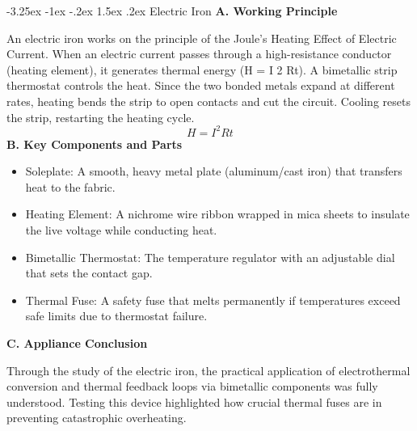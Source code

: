 \documentclass[11pt,a4paper]{report}
\makeatletter
\renewcommand{\section}{\@startsection{section}{1}{\z@}%
  {-3.25ex \@plus -1ex \@minus -.2ex}%
  {1.5ex \@plus.2ex}%
  {\normalfont\Large\bfseries\color{primaryColor}}}
\makeatother
\begin{document}
\section{Electric Iron}
\noindent\textbf{A. Working Principle}\par\medskip
An electric iron works on the principle of the Joule's Heating Effect of Electric Current. When an electric current passes through a high-resistance conductor (heating element), it generates thermal energy (H = I 2 Rt). A bimetallic strip thermostat controls the heat. Since the two bonded metals expand at different rates, heating bends the strip to open contacts and cut the circuit. Cooling resets the strip, restarting the heating cycle.
\begin{equation}H = I^2 R t\end{equation}
\noindent\textbf{B. Key Components and Parts}\par\medskip
\begin{itemize}
  \item Soleplate: A smooth, heavy metal plate (aluminum/cast iron) that transfers heat to the fabric.
  \item Heating Element: A nichrome wire ribbon wrapped in mica sheets to insulate the live voltage while conducting heat.
  \item Bimetallic Thermostat: The temperature regulator with an adjustable dial that sets the contact gap.
  \item Thermal Fuse: A safety fuse that melts permanently if temperatures exceed safe limits due to thermostat failure.
\end{itemize}
\noindent\textbf{C. Appliance Conclusion}\par\medskip
Through the study of the electric iron, the practical application of electrothermal conversion and thermal feedback loops via bimetallic components was fully understood. Testing this device highlighted how crucial thermal fuses are in preventing catastrophic overheating.
\end{document}
